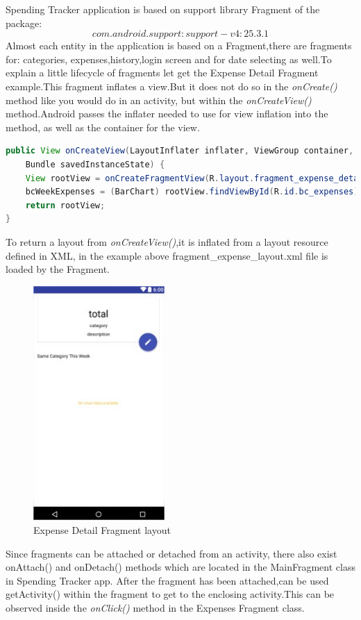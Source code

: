 Spending Tracker application is based on support library Fragment of the package:
 \[com.android.support:support-v4:25.3.1\] 
Almost each entity in the application is based on a Fragment,there are fragments for: categories,
expenses,history,login screen and for date selecting as well.To explain a little lifecycle of fragments let get the Expense Detail Fragment example.This fragment inflates a view.But it does not do so in the \textit{onCreate()} method like you would do in an activity, but within the \textit{onCreateView()} method.Android passes the inflater needed to use for view inflation into the method, as well as the container for the view.
\begin{lstlisting}[caption={View inflating in Expense Fragment},label={View inflating in Expense Fragment},language = Java]
public View onCreateView(LayoutInflater inflater, ViewGroup container,
	Bundle savedInstanceState) {
	View rootView = onCreateFragmentView(R.layout.fragment_expense_detail, inflater, container, true);
	bcWeekExpenses = (BarChart) rootView.findViewById(R.id.bc_expenses);
	return rootView;
}
\end{lstlisting}
To return a layout from \textit{onCreateView()},it is inflated from a layout resource defined in XML, in the example above fragment\_expense\_layout.xml file is loaded by the Fragment.
\begin{figure}[H]
	\centering
	\includegraphics[width=5cm]{Chapter3/fragment.jpg}
	\caption{Expense Detail Fragment layout}
	\label{fig:Expense Detail Fragment layout}
\end{figure}
Since fragments can be attached or detached from an activity, there also exist onAttach() and onDetach() methods which are located in the MainFragment class in Spending Tracker app. After the fragment has been attached,can be used getActivity() within the fragment to get to the enclosing activity.This can be observed inside the \textit{onClick()} method in the Expenses Fragment class.
